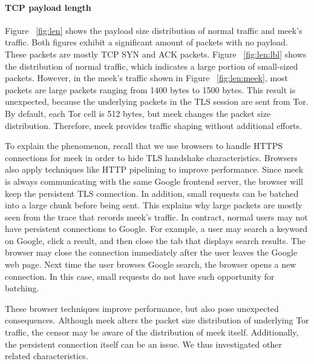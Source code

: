 \documentclass{article}
\begin{document}
\paragraph{TCP payload length}
Figure ~\ref{fig:len} shows the payload size distribution of normal traffic and meek's traffic. Both
figures exhibit a significant amount of packets with no payload. These packets are mostly TCP SYN and ACK
packets. Figure ~\ref{fig:len:lbl} shows the distribution of normal traffic, which indicates a large portion
of small-sized packets. However, in the meek's traffic shown in Figure ~\ref{fig:len:meek}, most packets
are large packets ranging from 1400 bytes to 1500 bytes. This result is unexpected, because the underlying packets 
in the TLS session are sent from Tor. By default, each Tor cell is 512 bytes, but meek changes the packet size 
distribution. Therefore, meek provides traffic shaping without additional efforts.

To explain the phenomenon, recall that we use browsers to handle HTTPS connections for meek in order
to hide TLS handshake characteristics.
Browsers also apply techniques like HTTP pipelining to improve performance. Since meek is always communicating with
the same Google frontend server, the browser will keep the persistent TLS connection. In addition, small requests 
can be batched into a large chunk before being sent. This explains why large packets are mostly seen from the trace that
records meek's traffic.
In contract, normal users may not have persistent connections to Google. For example, a user may search a keyword on
Google, click a result, and then close the tab that displays search results. The browser may close the 
connection immediately after the user leaves the Google web page. Next time the user browses Google search, the browser 
opens a new connection. In this case, small requests do not have such opportunity for batching.

These browser techniques improve performance, but also pose unexpected consequences. 
Although meek alters the packet size distribution of underlying Tor traffic, 
the censor may be aware of the distribution of meek itself. 
Additionally, the persistent connection itself can be an issue.
We thus investigated other related characteristics.
\end{document}
